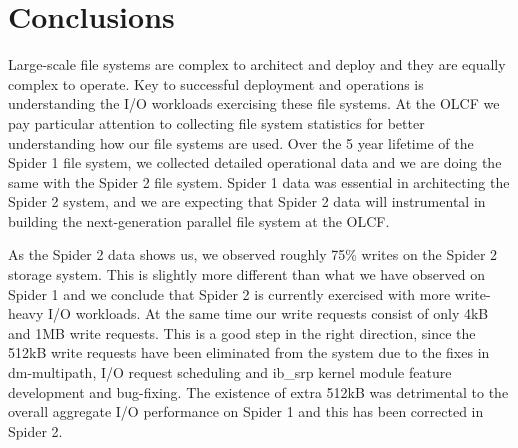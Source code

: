 \section*{Conclusions}
\label{sec:conc}

Large-scale file systems are complex to architect and deploy and they are
equally complex to operate. Key to successful deployment and operations is
understanding the I/O workloads exercising these file systems. At the OLCF we
pay particular attention to collecting file system statistics for better
understanding how our file systems are used. Over the 5 year lifetime of the
Spider 1 file system, we collected detailed operational data and we are doing
the same with the Spider 2 file system. Spider 1 data was essential in
architecting the Spider 2 system, and we are expecting that Spider 2 data will
instrumental in building the next-generation parallel file system at the OLCF.


As the Spider 2 data shows us, we observed roughly 75\% writes on the Spider 2
storage system. This is slightly more different than what we have observed on
Spider 1 and we conclude that Spider 2 is currently exercised with more
write-heavy I/O workloads. At the same time our write requests consist of only
4kB and 1MB write requests. This is a good step in the right direction, since
the 512kB write requests have been eliminated from the system due to the fixes
in dm-multipath, I/O request scheduling and ib\_srp kernel module feature
development and bug-fixing. The existence of extra 512kB was detrimental to the
overall aggregate I/O performance on Spider 1 and this has been corrected in
Spider 2.

